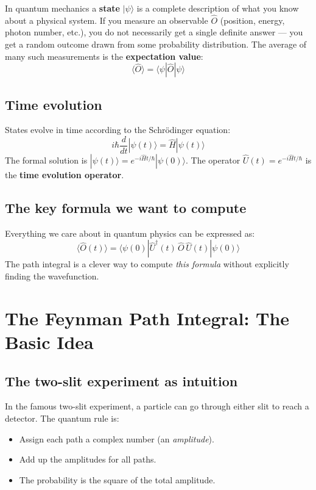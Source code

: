 \documentclass[12pt]{article}
\newcommand{\bra}[1]{\langle #1 |}
\newcommand{\ket}[1]{| #1 \rangle}
\newcommand{\av}[1]{\langle #1 \rangle}
\begin{document}
In quantum mechanics a \textbf{state} $\ket{\psi}$ is a complete
description of what you know about a physical system. If you measure
an observable $\hat{O}$ (position, energy, photon number, etc.), you
do not necessarily get a single definite answer --- you get a random
outcome drawn from some probability distribution. The average of many
such measurements is the \textbf{expectation value}:
\begin{equation}
  \av{\hat{O}} = \bra{\psi}\hat{O}\ket{\psi}
\end{equation}

\subsection{Time evolution}

States evolve in time according to the Schrödinger equation:
\begin{equation}
  i\hbar\frac{d}{dt}\ket{\psi(t)} = \hat{H}\ket{\psi(t)}
\end{equation}
The formal solution is $\ket{\psi(t)} = e^{-i\hat{H}t/\hbar}\ket{\psi(0)}$.
The operator $\hat{U}(t) = e^{-i\hat{H}t/\hbar}$ is the
\textbf{time evolution operator}.

\subsection{The key formula we want to compute}

Everything we care about in quantum physics can be expressed as:
\begin{equation}
  \av{\hat{O}(t)} = \bra{\psi(0)}\hat{U}^\dagger(t)\,\hat{O}\,\hat{U}(t)\ket{\psi(0)}
  \label{eq:expect}
\end{equation}
The path integral is a clever way to compute \emph{this formula}
without explicitly finding the wavefunction.

\section{The Feynman Path Integral: The Basic Idea}

\subsection{The two-slit experiment as intuition}

In the famous two-slit experiment, a particle can go through either
slit to reach a detector. The quantum rule is:
\begin{itemize}
  \item Assign each path a complex number (an \emph{amplitude}).
  \item Add up the amplitudes for all paths.
  \item The probability is the square of the total amplitude.
\end{itemize}
\end{document}
